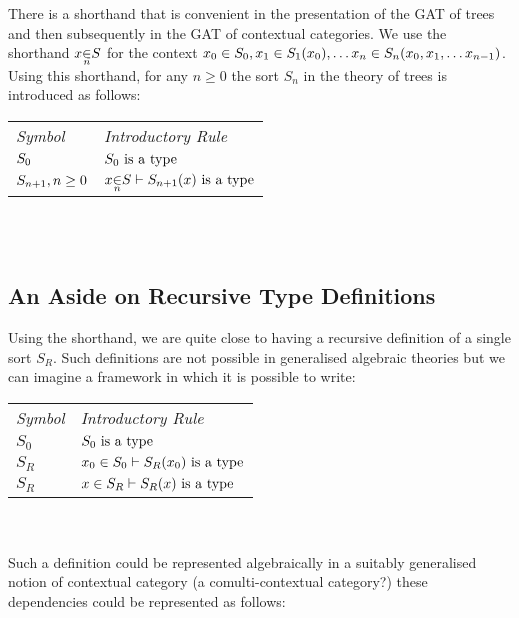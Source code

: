 \documentclass[10pt,a4paper]{scrartcl}
\begin{document}
There is a  shorthand that is convenient in the presentation  of the GAT of trees  and then subsequently in the GAT of contextual categories. We use the shorthand
$\ofTn{x}{n}{S}$ for the context $x_0 \in S_0,x_1 \in S_{1}(x_0), \hdots x_n \in S_{n}(x_0,x_1,\hdots x_{n-1}) $. \\

\noindent Using this shorthand, for any $n \geq 0$ the sort $S_n$  in the theory of trees is introduced as follows: \\

\vspace{0.03cm} 
\begin{tabular}{>{\itshape}l l}
Symbol & \itshape{Introductory Rule} \\
$S_0  $     & $S_0\mbox{ is a type}$\\
$S_{n+1}, n \geq 0 $ & $\ofTn{x}{n}{S}    \tstyle \isT{\Si{n+1}(x)} $\\
\end{tabular} \\
\vspace{.1cm}  \\


\subsection {An Aside on Recursive Type Definitions}

Using the shorthand, we are quite close to having a recursive definition of a single sort $S_R$.
Such definitions are not possible in generalised algebraic theories but we can imagine a framework in which it is possible to write: \\
\vspace{0.03cm} 
\begin{tabular}{>{\itshape}l l}
Symbol & \itshape{Introductory Rule} \\
$S_0  $     & $S_0\mbox{ is a type}$\\
$S_R  $     & $x_0 \in S_0    \vdash S_R(x_0)\mbox{ is a type} $\\
$S_R $      & $x \in S_R    \vdash S_R(x)\mbox{ is a type} $\\
\end{tabular} \\
\vspace{.1cm}  \\

Such a definition could be represented algebraically in a suitably generalised notion of contextual category (a comulti-contextual category?) these dependencies could be represented
as follows:  
\end{document}
